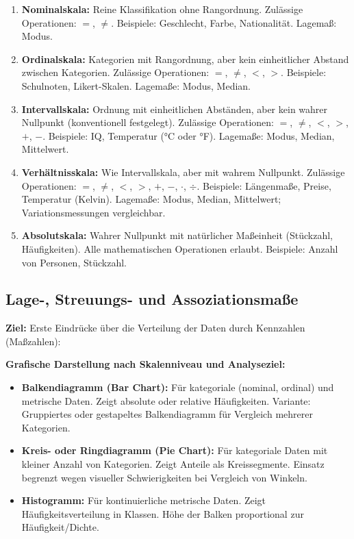 \begin{enumerate}[leftmargin=2em]
    \item \textbf{Nominalskala:} Reine Klassifikation ohne Rangordnung. Zulässige Operationen: $=$, $\neq$. Beispiele: Geschlecht, Farbe, Nationalität. Lagemaß: Modus.
    
    \item \textbf{Ordinalskala:} Kategorien mit Rangordnung, aber kein einheitlicher Abstand zwischen Kategorien. Zulässige Operationen: $=$, $\neq$, $<$, $>$. Beispiele: Schulnoten, Likert-Skalen. Lagemaße: Modus, Median.
    
    \item \textbf{Intervallskala:} Ordnung mit einheitlichen Abständen, aber kein wahrer Nullpunkt (konventionell festgelegt). Zulässige Operationen: $=$, $\neq$, $<$, $>$, $+$, $-$. Beispiele: IQ, Temperatur (°C oder °F). Lagemaße: Modus, Median, Mittelwert.
    
    \item \textbf{Verhältnisskala:} Wie Intervallskala, aber mit wahrem Nullpunkt. Zulässige Operationen: $=$, $\neq$, $<$, $>$, $+$, $-$, $\cdot$, $\div$. Beispiele: Längenmaße, Preise, Temperatur (Kelvin). Lagemaße: Modus, Median, Mittelwert; Variationsmessungen vergleichbar.
    
    \item \textbf{Absolutskala:} Wahrer Nullpunkt mit natürlicher Maßeinheit (Stückzahl, Häufigkeiten). Alle mathematischen Operationen erlaubt. Beispiele: Anzahl von Personen, Stückzahl.
\end{enumerate}

\newpage

\subsection{Lage-, Streuungs- und Assoziationsmaße}

\textbf{Ziel:} Erste Eindrücke über die Verteilung der Daten durch Kennzahlen (Maßzahlen):


\textbf{Grafische Darstellung nach Skalenniveau und Analyseziel:}

\begin{itemize}[leftmargin=1.5em]
    \item \textbf{Balkendiagramm (Bar Chart):} Für kategoriale (nominal, ordinal) und metrische Daten. Zeigt absolute oder relative Häufigkeiten. Variante: Gruppiertes oder gestapeltes Balkendiagramm für Vergleich mehrerer Kategorien.
    \item \textbf{Kreis- oder Ringdiagramm (Pie Chart):} Für kategoriale Daten mit kleiner Anzahl von Kategorien. Zeigt Anteile als Kreissegmente. Einsatz begrenzt wegen visueller Schwierigkeiten bei Vergleich von Winkeln.
    \item \textbf{Histogramm:} Für kontinuierliche metrische Daten. Zeigt Häufigkeitsverteilung in Klassen. Höhe der Balken proportional zur Häufigkeit/Dichte.
\end{itemize}

